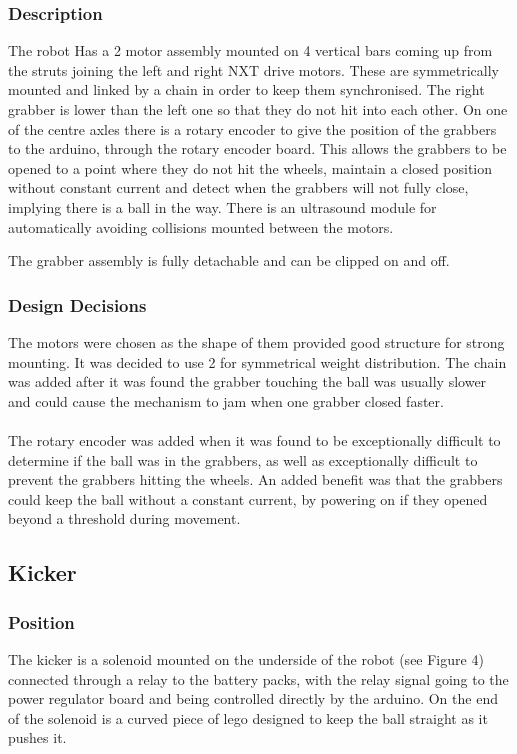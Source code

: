 \subsubsection{Description}
The robot Has a 2 motor assembly mounted on 4 vertical bars coming up from the struts joining the left and right NXT drive motors. These are symmetrically mounted and linked by a chain in order to keep them synchronised. The right grabber is lower than the left one so that they do not hit into each other. On one of the centre axles there is a rotary encoder to give the position of the grabbers to the arduino, through the rotary encoder board. This allows the grabbers to be opened to a point where they do not hit the wheels, maintain a closed position without constant current and detect when the grabbers will not fully close, implying there is a ball in the way. There is an ultrasound module for automatically avoiding collisions mounted between the motors. 

The grabber assembly is fully detachable and can be clipped on and off. 

\subsubsection{Design Decisions}
The motors were chosen as the shape of them provided good structure for strong mounting. It was decided to use 2 for symmetrical weight distribution. The chain was added after it was found the grabber touching the ball was usually slower and could cause the mechanism to jam when one grabber closed faster.
\\ \\
The rotary encoder was added when it was found to be exceptionally difficult to determine if the ball was in the grabbers, as well as exceptionally difficult to prevent the grabbers hitting the wheels. An added benefit was that the grabbers could keep the ball without a constant current, by powering on if they opened beyond a threshold during movement. 



\subsection{Kicker}
\subsubsection{Position}
The kicker is a solenoid mounted on the underside of the robot (see Figure 4) connected through a relay to the battery packs, with the relay signal going to the power regulator board and being controlled directly by the arduino. On the end of the solenoid is a curved piece of lego designed to keep the ball straight as it pushes it.

